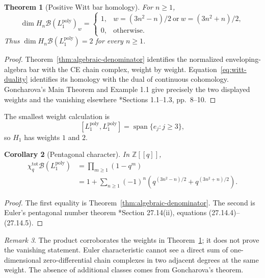 \documentclass[11pt,reqno]{amsart}
\newtheorem{theorem}{Theorem}[section]
\newtheorem{corollary}[theorem]{Corollary}
\theoremstyle{definition}
\theoremstyle{remark}
\newtheorem{remark}[theorem]{Remark}
\begin{document}
\begin{theorem}[Positive Witt bar homology]
\label{thm:witt-homology}
For \(n\ge1\),
\[
 \dim H_n\mathcal B(L_1^{\mathrm{poly}})_w
 =
 \begin{cases}
 1,&w=(3n^2-n)/2\ \text{or}\ w=(3n^2+n)/2,\\
 0,&\text{otherwise}.
 \end{cases}
\]
Thus
\(\dim H_n\mathcal B(L_1^{\mathrm{poly}})=2\) for every \(n\ge1\).
\end{theorem}

\begin{proof}
Theorem~\ref{thm:algebraic-denominator} identifies the normalized
enveloping-algebra bar with the CE chain complex, weight by weight.
Equation~\eqref{eq:witt-duality} identifies its homology with the dual
of continuous cohomology.  Goncharova's Main Theorem and Example 1.1
give precisely the two displayed weights and the vanishing elsewhere
\cite{Gon73}*{Sections 1.1--1.3, pp.~8--10}.
\end{proof}

The smallest weight calculation is
\[
 [L_1^{\mathrm{poly}},L_1^{\mathrm{poly}}]
 =\operatorname{span}\{e_j:j\ge3\},
\]
so \(H_1\) has weights \(1\) and \(2\).

\begin{corollary}[Pentagonal character]
\label{cor:pentagonal-character}
In \(\mathbb Z[[q]]\),
\[
\begin{aligned}
 \chi_q^{\mathrm{tot}}\mathcal B(L_1^{\mathrm{poly}})
 &=\prod_{m\ge1}(1-q^m)\\
 &=1+\sum_{n\ge1}(-1)^n
 \left(q^{(3n^2-n)/2}+q^{(3n^2+n)/2}\right).
\end{aligned}
\]
\end{corollary}

\begin{proof}
The first equality is
Theorem~\ref{thm:algebraic-denominator}.  The second is Euler's
pentagonal number theorem
\cite{DLMF}*{Section 27.14(ii), equations (27.14.4)--(27.14.5)}.
\end{proof}

\begin{remark}
The product corroborates the weights in
Theorem~\ref{thm:witt-homology}; it does not prove the vanishing
statement.  Euler characteristic cannot see a direct sum of
one-dimensional zero-differential chain complexes in two adjacent
degrees at the same weight.  The absence of additional classes comes
from Goncharova's theorem.
\end{remark}
\end{document}
